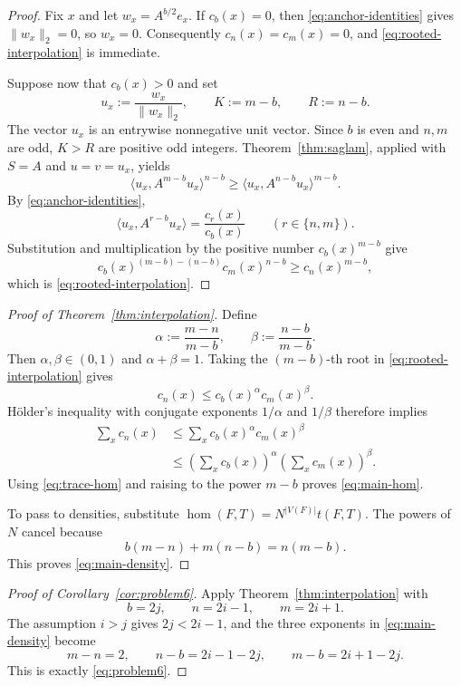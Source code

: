 \documentclass[11pt]{article}
\theoremstyle{definition}
\theoremstyle{remark}
\newcommand{\homn}{\operatorname{hom}}
\begin{document}
\begin{proof}
  Fix $x$ and let $w_x=A^{b/2}e_x$.  If $c_b(x)=0$, then
  \eqref{eq:anchor-identities} gives $\|w_x\|_2=0$, so $w_x=0$.
  Consequently $c_n(x)=c_m(x)=0$, and
  \eqref{eq:rooted-interpolation} is immediate.

  Suppose now that $c_b(x)>0$ and set
  \[
    u_x:=\frac{w_x}{\|w_x\|_2},
    \qquad
    K:=m-b,
    \qquad
    R:=n-b.
  \]
  The vector $u_x$ is an entrywise nonnegative unit vector.  Since $b$
  is even and $n,m$ are odd, $K>R$ are positive odd integers.
  Theorem~\ref{thm:saglam}, applied with $S=A$ and $u=v=u_x$, yields
  \[
    \langle u_x,A^{m-b}u_x\rangle^{n-b}
    \ge
    \langle u_x,A^{n-b}u_x\rangle^{m-b}.
  \]
  By \eqref{eq:anchor-identities},
  \[
    \langle u_x,A^{r-b}u_x\rangle
    =\frac{c_r(x)}{c_b(x)}
    \qquad(r\in\{n,m\}).
  \]
  Substitution and multiplication by the positive number
  $c_b(x)^{m-b}$ give
  \[
    c_b(x)^{(m-b)-(n-b)}c_m(x)^{n-b}
    \ge c_n(x)^{m-b},
  \]
  which is \eqref{eq:rooted-interpolation}.
\end{proof}

\begin{proof}[Proof of Theorem~\ref{thm:interpolation}]
  Define
  \[
    \alpha:=\frac{m-n}{m-b},
    \qquad
    \beta:=\frac{n-b}{m-b}.
  \]
  Then $\alpha,\beta\in(0,1)$ and $\alpha+\beta=1$.
  Taking the $(m-b)$-th root in
  \eqref{eq:rooted-interpolation} gives
  \[
    c_n(x)\le c_b(x)^\alpha c_m(x)^\beta.
  \]
  H\"older's inequality with conjugate exponents $1/\alpha$ and
  $1/\beta$ therefore implies
  \[
  \begin{aligned}
    \sum_xc_n(x)
    &\le \sum_x c_b(x)^\alpha c_m(x)^\beta\\
    &\le
    \left(\sum_xc_b(x)\right)^\alpha
    \left(\sum_xc_m(x)\right)^\beta.
  \end{aligned}
  \]
  Using \eqref{eq:trace-hom} and raising to the power $m-b$ proves
  \eqref{eq:main-hom}.

  To pass to densities, substitute
  $\homn(F,T)=N^{|V(F)|}t(F,T)$.  The powers of $N$ cancel because
  \[
    b(m-n)+m(n-b)=n(m-b).
  \]
  This proves \eqref{eq:main-density}.
\end{proof}

\begin{proof}[Proof of Corollary~\ref{cor:problem6}]
  Apply Theorem~\ref{thm:interpolation} with
  \[
    b=2j,
    \qquad
    n=2i-1,
    \qquad
    m=2i+1.
  \]
  The assumption $i>j$ gives $2j<2i-1$, and the three exponents in
  \eqref{eq:main-density} become
  \[
    m-n=2,
    \qquad
    n-b=2i-1-2j,
    \qquad
    m-b=2i+1-2j.
  \]
  This is exactly \eqref{eq:problem6}.
\end{proof}
\end{document}
